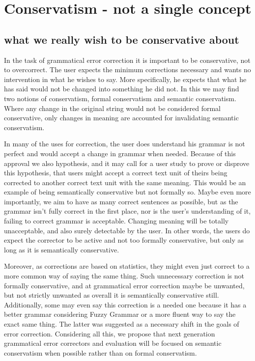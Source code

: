 \documentclass[english]{article}
\begin{document}
\section{Conservatism - not a single concept}

\subsection{what we really wish to be conservative about}

In the task of grammatical error correction it is important to be
conservative, not to overcorrect. The user expects the minimum corrections
necessary and wants no intervention in what he wishes to say. More
specifically, he expects that what he has said would not be changed
into something he did not. In this we may find two notions of conservatism,
formal conservatism and semantic conservatism. Where any change in
the original string would not be considered formal conservative, only
changes in meaning are accounted for invalidating semantic conservatism. 

In many of the uses for correction,
the user does understand his grammar is not perfect and would accept
a change in grammar when needed. Because of this approval we also
hypothesis, and it may call for a user study to prove or disprove
this hypothesis, that users might accept a correct text unit of theirs
being corrected to another correct text unit with the same meaning.
This would be an example of being semantically conservative but not formally so.
Maybe even more importantly, we aim to have as many correct sentences
as possible, but as the grammar isn't fully correct in the first place,
nor is the user's understanding of it, failing to correct grammar
is acceptable. Changing meaning will be totally unacceptable, and
also surely detectable by the user. In other words, the users do expect
the corrector to be active and not too formally conservative, but
only as long as it is semantically conservative. 

Moreover, as corrections are based on statistics, they might even
just correct to a more common way of saying the same thing. Such unnecessary
correction is not formally conservative, and at grammatical error
correction maybe be unwanted, but not strictly unwanted as overall
it is semantically conservative still. Additionally, some may even
say this correction is a needed one because it has a better grammar considering
Fuzzy Grammar\cite{lakoff1973fuzzy,madnani2011they} or a more fluent
way to say the exact same thing. The latter was suggested as a necessary
shift in the goals of error correction\cite{sakaguchi2016reassessing}.
Considering all this, we propose that next generation grammatical
error correctors and evaluation will be focused on semantic conservatism
when possible rather than on formal conservatism.
\end{document}
